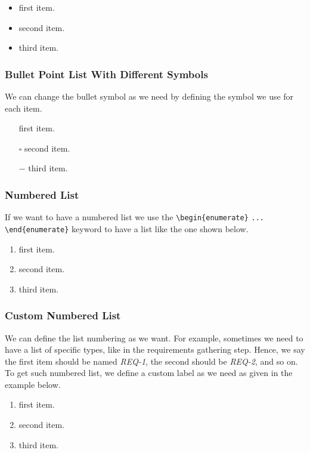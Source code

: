 \begin{itemize}
    \item first item.
    \item second item.
    \item third item.
\end{itemize}

\subsubsection{Bullet Point List With Different Symbols}

We can change the bullet symbol as we need by defining the symbol we use for each item.

\begin{itemize}     
    \item[\textbullet] first item.
    \item[$\square$] second item.
    \item[$-$] third item.
\end{itemize}

\subsubsection{Numbered List}

If we want to have a numbered list we use the \verb|\begin{enumerate}| \verb|...| \verb|\end{enumerate}| keyword to have a list like the one shown below.

\begin{enumerate}
    \item first item.
    \item second item.
    \item third item.
\end{enumerate}

\subsubsection{Custom Numbered List}

We can define the list numbering as we want. For example, sometimes we need to have a list of specific types, like in the requirements gathering step. Hence, we say the first item should be named \emph{REQ-1}, the second should be \emph{REQ-2}, and so on. To get such numbered list, we define a custom label as we need as given in the example below.

\begin{enumerate}[label=\textbf{REQ-\arabic*:}]
    \item first item.
    \item second item.
    \item third item.
\end{enumerate}

